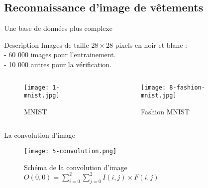 \subsection{Reconnaissance d’image de vêtements }

\begin{frame}{Une base de données plus complexe}
    \begin{block}{Description}
        Images de taille $28 \times 28$ pixels en noir et blanc : \\
        \quad - 60 000 images pour l'entrainement. \\
        \quad - 10 000 autres pour la vérification.
    \end{block}
    \begin{columns}
        \begin{column}{0.5\textwidth}
            \begin{figure}
                \centering
                \texttt{[image: 1-mnist.jpg]}
                \caption{MNIST}
            \end{figure}
        \end{column}
        \begin{column}{0.5\textwidth}
            \begin{figure}
                \centering
                \texttt{[image: 8-fashion-mnist.jpg]}
                \caption{Fashion MNIST}
            \end{figure}
        \end{column}
    \end{columns}
\end{frame}

\begin{frame}{La convolution d'image}
    \begin{figure}
        \centering
        \texttt{[image: 5-convolution.png]}
        \centering
        \caption{Schéma de la convolution d'image $O(0, 0) = \sum_{i=0}^{2}\sum_{j=0}^{2}I(i, j)\times F(i, j)$}
    \end{figure}
\end{frame}


